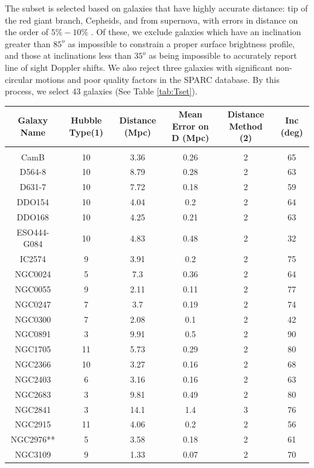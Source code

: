 \documentclass[reprint,%
 amsmath,amssymb,
 aps,
]{revtex4-1}
\begin{document}
  
  The  subset is selected based on
   galaxies that have highly accurate distance:   tip of the red giant branch,  Cepheids, and  from supernova, with errors in distance on the order of $5\% - 10\%$ \cite{2016Lelli}. Of these, we   exclude galaxies  which have an inclination greater than $85^o$ as impossible to constrain a proper surface brightness profile, and those at inclinations less than $35^o$ as being impossible to accurately report line of sight Doppler shifts.  We also reject  three galaxies with significant non-circular motions and poor quality factors in the SPARC database.  
  By this process, we select 43 galaxies (See Table \ref{tab:Tset}). 
  
  
  \begin{table}[]
      \centering
      \begin{tabular}{|c|c|c|c|c|c|}
      \hline \hline
Galaxy Name & Hubble Type(1)& 	Distance (Mpc)&Mean Error on D (Mpc)& 	Distance Method (2)& 	Inc (deg)\\
    \hline \hline\\
CamB&   	10&    3.36&  	0.26&   2&  65\\
D564-8& 	10& 	8.79& 	0.28& 	2& 	63\\
D631-7& 	10& 	7.72& 	0.18& 	2& 	59\\
DDO154& 	10& 	4.04& 	0.2& 	2& 	64\\
DDO168& 	10& 	4.25& 	0.21& 	2& 	63\\
ESO444-G084& 10& 	4.83& 	0.48& 	2& 	32\\
IC2574& 	9& 	3.91& 	0.2&    	2& 	75\\
NGC0024& 	5& 	7.3& 	0.36&   	2& 	64\\
NGC0055& 	9& 	2.11& 	0.11&   	2& 	77\\
NGC0247& 	7& 	3.7& 	0.19&   	2& 	74\\
NGC0300& 	7& 	2.08& 	0.1&    	2& 	42\\
NGC0891& 	3& 	9.91& 	0.5&    	2& 	90\\
NGC1705& 	11& 	5.73& 	0.29& 	2& 	80\\
NGC2366& 	10& 	3.27& 	0.16& 	2& 	68\\
NGC2403& 	6& 	3.16& 	0.16&   	2& 	63\\
NGC2683& 	3& 	9.81& 	0.49&   	2& 	80\\
NGC2841& 	3& 	14.1& 	1.4&    	3& 	76\\
NGC2915& 	11& 	4.06& 	0.2& 	2& 	56\\
NGC2976**& 	5& 	3.58& 	0.18&   	2& 	61\\
NGC3109& 	9& 	1.33& 	0.07&   	2& 	70\\

\end{tabular}
\end{table}
\end{document}
